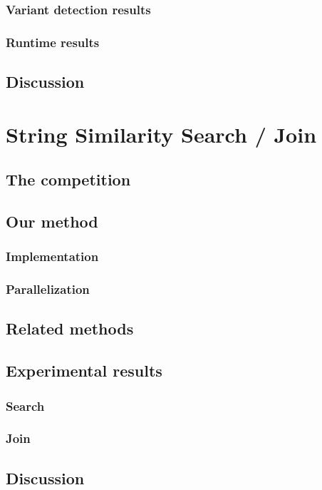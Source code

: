 \subsection{Variant detection results}
\subsection{Runtime results}
\section{Discussion}

\chapter{String Similarity Search / Join}
\section{The competition}
\section{Our method}
\subsection{Implementation}
\subsection{Parallelization}
\section{Related methods}
\section{Experimental results}
\subsection{Search}
\subsection{Join}
\section{Discussion}
